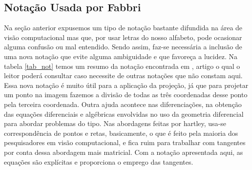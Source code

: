 \subsection{Notação Usada por Fabbri}

Na seção anterior expusemos um tipo de notação bastante difundida na área de visão computacional mas que, por usar letras do nosso alfabeto, pode ocasionar alguma confusão ou mal entendido. Sendo assim, faz-se necessária a inclusão de uma nova notação que evite alguma ambiguidade e que favoreça a lucidez. Na tabela \ref{tab_not} temos um resumo da notação encontrada em \cite{Fabbri:Kimia:IJCV2015}, artigo o qual o leitor poderá consultar caso necessite de outras notações que não constam aqui. Essa nova notação é muito útil para a aplicação da projeção, já que para projetar um ponto na imagem fazemos a divisão de todas as três coordenadas desse ponto pela terceira coordenada. Outra ajuda acontece nas diferenciações, na obtenção das equações diferenciais e algébricas envolvidas no uso da geometria diferencial para abordar problemas do tipo. Nas abordagens feitas por hartley, usa-se correspondência de pontos e retas, basicamente, o que é feito pela maioria dos pesquisadores em visão computacional, e fica ruim para trabalhar com tangentes por conta dessa abordagem mais matricial. Com a notação apresentada aqui, as equações são explícitas e proporciona o emprego das tangentes.

